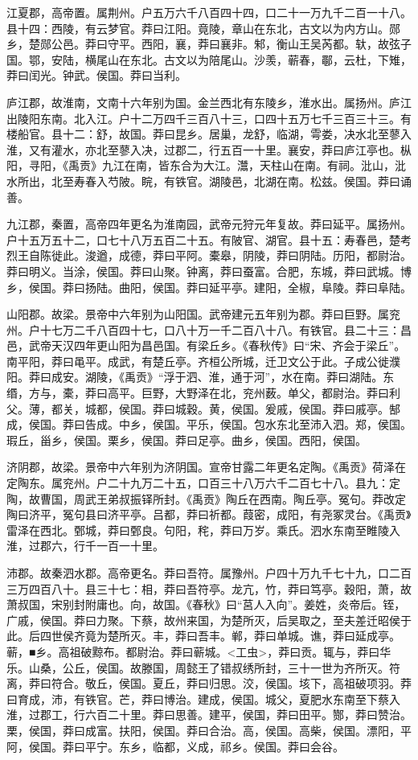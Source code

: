 \documentclass[]{article}
\begin{document}
江夏郡，高帝置。属荆州。户五万六千八百四十四，口二十一万九千二百一十八。县十四：西陵，有云梦官。莽曰江阳。竟陵，章山在东北，古文以为内方山。郧乡，楚郧公邑。莽曰守平。西阳，襄，莽曰襄非。邾，衡山王吴芮都。轪，故弦子国。鄂，安陆，横尾山在东北。古文以为陪尾山。沙羡，蕲春，鄳，云杜，下雉，莽曰闰光。钟武。侯国。莽曰当利。

庐江郡，故淮南，文南十六年别为国。金兰西北有东陵乡，淮水出。属扬州。庐江出陵阳东南。北入江。户十二万四千三百八十三，口四十五万七千三百三十三。有楼船官。县十二：舒，故国。莽曰昆乡。居巢，龙舒，临湖，雩娄，决水北至蓼入淮，又有灌水，亦北至蓼入决，过郡二，行五百一十里。襄安，莽曰庐江亭也。枞阳，寻阳，《禹贡》九江在南，皆东合为大江。灊，天柱山在南。有祠。沘山，沘水所出，北至寿春入芍陂。睆，有铁官。湖陵邑，北湖在南。松兹。侯国。莽曰诵善。

九江郡，秦置，高帝四年更名为淮南园，武帝元狩元年复故。莽曰延平。属扬州。户十五万五十二，口七十八万五百二十五。有陂官、湖官。县十五：寿春邑，楚考烈王自陈徙此。浚遒，成德，莽曰平阿。橐皋，阴陵，莽曰阴陆。历阳，都尉治。莽曰明义。当涂，侯国。莽曰山聚。钟离，莽曰蚕富。合肥，东城，莽曰武城。博乡，侯国。莽曰扬陆。曲阳，侯国。莽曰延平亭。建阳，全椒，阜陵。莽曰阜陆。

山阳郡。故梁。景帝中六年别为山阳国。武帝建元五年别为郡。莽曰巨野。属兖州。户十七万二千八百四十七，口八十万一千二百八十八。有铁官。县二十三：昌邑，武帝天汉四年更山阳为昌邑国。有梁丘乡。《春秋传》曰``宋、齐会于梁丘''。南平阳，莽曰黾平。成武，有楚丘亭。齐桓公所城，迁卫文公于此。子成公徙濮阳。莽曰成安。湖陵，《禹贡》``浮于泗、淮，通于河''，水在南。莽曰湖陆。东缗，方与，橐，莽曰高平。巨野，大野泽在北，兖州薮。单父，都尉治。莽曰利父。薄，都关，城都，侯国。莽曰城穀。黄，侯国。爰戚，侯国。莽曰戚亭。郜成，侯国。莽曰告成。中乡，侯国。平乐，侯国。包水东北至沛入泗。郑，侯国。瑕丘，甾乡，侯国。栗乡，侯国。莽曰足亭。曲乡，侯国。西阳，侯国。

济阴郡，故梁。景帝中六年别为济阴国。宣帝甘露二年更名定陶。《禹贡》荷泽在定陶东。属兖州。户二十九万二十五，口百三十八万六千二百七十八。县九：定陶，故曹国，周武王弟叔振铎所封。《禹贡》陶丘在西南。陶丘亭。冤句。莽改定陶曰济平，冤句县曰济平亭。吕都，莽曰祈都。葭密，成阳，有尧冢灵台。《禹贡》雷泽在西北。鄄城，莽曰鄄良。句阳，秺，莽曰万岁。乘氏。泗水东南至睢陵入淮，过郡六，行千一百一十里。

沛郡。故秦泗水郡。高帝更名。莽曰吾符。属豫州。户四十万九千七十九，口二百三万四百八十。县三十七：相，莽曰吾符亭。龙亢，竹，莽曰笃亭。穀阳，萧，故萧叔国，宋别封附庸也。向，故国。《春秋》曰``莒人入向''。姜姓，炎帝后。铚，广戚，侯国。莽曰力聚。下蔡，故州来国，为楚所灭，后吴取之，至夫差迁昭侯于此。后四世侯齐竟为楚所灭。丰，莽曰吾丰。郸，莽曰单城。谯，莽曰延成亭。蕲，■乡。高祖破黥布。都尉治。莽曰蕲城。\textless{}工虫\textgreater{}，莽曰贡。辄与，莽曰华乐。山桑，公丘，侯国。故滕国，周懿王了错叔绣所封，三十一世为齐所灭。符离，莽曰符合。敬丘，侯国。夏丘，莽曰归思。洨，侯国。垓下，高祖破项羽。莽曰育成，沛，有铁官。芒，莽曰博治。建成，侯国。城父，夏肥水东南至下蔡入淮，过郡工，行六百二十里。莽曰思善。建平，侯国，莽曰田平。酂，莽曰赞治。栗，侯国，莽曰成富。扶阳，侯国。莽曰合治。高，侯国。高柴，侯国。漂阳，平阿，侯国。莽曰平宁。东乡，临都，义成，祁乡。侯国。莽曰会谷。
\end{document}
